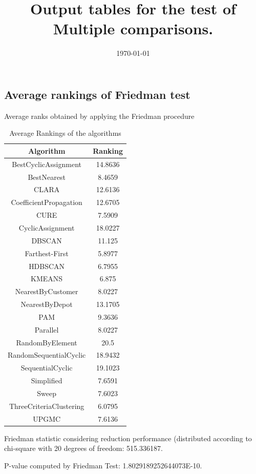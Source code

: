 \documentclass[a4paper,10pt]{article}
\title{Output tables for the test of Multiple comparisons.}
\author{}
\date{\today}
\begin{document}
\begin{landscape}
\pagestyle{empty}
\maketitle
\thispagestyle{empty}
\section{Average rankings of Friedman test}



Average ranks obtained by applying the Friedman procedure

\begin{table}[!htp]
\centering
\begin{tabular}{|c|c|}\hline
Algorithm&Ranking\\\hline
BestCyclicAssignment & 14.8636\\
BestNearest & 8.4659\\
CLARA & 12.6136\\
CoefficientPropagation & 12.6705\\
CURE & 7.5909\\
CyclicAssignment & 18.0227\\
DBSCAN & 11.125\\
Farthest-First & 5.8977\\
HDBSCAN & 6.7955\\
KMEANS & 6.875\\
NearestByCustomer & 8.0227\\
NearestByDepot & 13.1705\\
PAM & 9.3636\\
Parallel & 8.0227\\
RandomByElement & 20.5\\
RandomSequentialCyclic & 18.9432\\
SequentialCyclic & 19.1023\\
Simplified & 7.6591\\
Sweep & 7.6023\\
ThreeCriteriaClustering & 6.0795\\
UPGMC & 7.6136\\
\hline
\end{tabular}
\caption{Average Rankings of the algorithms}
\end{table}

Friedman statistic considering reduction performance (distributed according to chi-square with 20 degrees of freedom: 515.336187.

P-value computed by Friedman Test: 1.8029189252644073E-10.\newline


\end{landscape}
\end{document}
